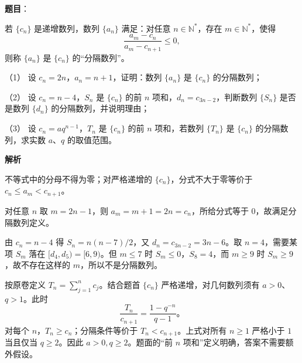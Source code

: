 \begin{answer}

\textbf{题目}：

若 $\{c_n\}$ 是递增数列，数列 $\{a_n\}$ 满足：对任意 $n\in\mathbb N^*$，存在 $m\in\mathbb N^*$，使得
\nopagebreak[4]
\[
\frac{a_m-c_n}{a_m-c_{n+1}}\leq0,
\]
则称 $\{a_n\}$ 是 $\{c_n\}$ 的“分隔数列”。

（1） 设 $c_n=2n$，$a_n=n+1$，证明：数列 $\{a_n\}$ 是 $\{c_n\}$ 的分隔数列；

（2） 设 $c_n=n-4$，$S_n$ 是 $\{c_n\}$ 的前 $n$ 项和，$d_n=c_{3n-2}$，判断数列 $\{S_n\}$ 是否是数列 $\{d_n\}$ 的分隔数列，并说明理由；

（3） 设 $c_n=aq^{n-1}$，$T_n$ 是 $\{c_n\}$ 的前 $n$ 项和，若数列 $\{T_n\}$ 是 $\{c_n\}$ 的分隔数列，求实数 $a\text{、}q$ 的取值范围。

\textbf{解析}

不等式中的分母不得为零；对严格递增的 $\{c_n\}$，分式不大于零等价于 $c_n\leq a_m<c_{n+1}$。


对任意 $n$ 取 $m=2n-1$，则 $a_m=m+1=2n=c_n$，所给分式等于 $0$，故满足分隔数列定义。


由 $c_n=n-4$ 得 $S_n=n(n-7)/2$，又 $d_n=c_{3n-2}=3n-6$。取 $n=4$，需要某项 $S_m$ 落在 $[d_4,d_5)=[6,9)$。但 $m\leq7$ 时 $S_m\leq0$，$S_8=4$，而 $m\geq9$ 时 $S_m\geq9$，故不存在这样的 $m$，所以不是分隔数列。


按原卷定义 $T_n=\sum_{j=1}^n c_j$。结合题首 $\{c_n\}$ 严格递增，对几何数列须有 $a>0$、$q>1$。此时
\nopagebreak[4]
\[
\frac{T_n}{c_{n+1}}=\frac{1-q^{-n}}{q-1}\text{。}
\]
对每个 $n$，$T_n\geq c_n$；分隔条件等价于 $T_n<c_{n+1}$。上式对所有 $n\geq1$ 严格小于 $1$ 当且仅当 $q\geq2$。因此 $a>0,q\geq2$。题面的“前 $n$ 项和”定义明确，答案不需要额外假设。




\end{answer}